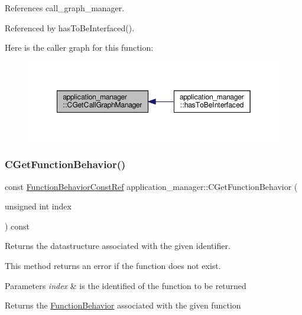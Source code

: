References call\+\_\+graph\+\_\+manager.



Referenced by has\+To\+Be\+Interfaced().

Here is the caller graph for this function\+:
\nopagebreak
\begin{figure}[H]
\begin{center}
\leavevmode
\includegraphics[width=349pt]{dc/db5/classapplication__manager_a087dd36277853a12e84e84da91e82784_icgraph}
\end{center}
\end{figure}
\mbox{\label{classapplication__manager_ad201b883f3f2383c4c8256d9ba1177f1}} 
\subsubsection{\texorpdfstring{C\+Get\+Function\+Behavior()}{CGetFunctionBehavior()}}
{\footnotesize\ttfamily const \hyperlink{function__behavior_8hpp_a94872da12ed056b6ecf90456164e0213}{Function\+Behavior\+Const\+Ref} application\+\_\+manager\+::\+C\+Get\+Function\+Behavior (\begin{DoxyParamCaption}\item[{unsigned int}]{index }\end{DoxyParamCaption}) const}



Returns the datastructure associated with the given identifier. 

This method returns an error if the function does not exist. 
\begin{DoxyParams}{Parameters}
{\em index} & is the identified of the function to be returned \\
\hline
\end{DoxyParams}
\begin{DoxyReturn}{Returns}
the \hyperlink{classFunctionBehavior}{Function\+Behavior} associated with the given function 
\end{DoxyReturn}


